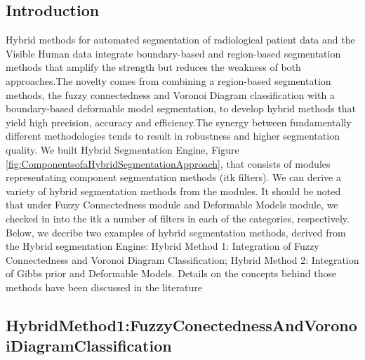 %
%
% 
%
%
%

\subsection{Introduction}
\label{sec:HybridSegmentationIntroduction}


Hybrid methods for automated segmentation of radiological patient data and the 
Visible Human data integrate boundary-based and region-based segmentation methods 
that amplify the strength but reduces the weakness of both approaches.The novelty 
comes from combining a region-based segmentation methods, the fuzzy connectedness 
and Voronoi Diagram classification with a boundary-based deformable model 
segmentation, to develop hybrid methods that yield high precision, accuracy and 
efficiency.The synergy between fundamentally different methodologies tends to 
result in robustness and higher segmentation quality. We built Hybrid Segmentation 
Engine,  Figure \ref{fig:ComponentsofaHybridSegmentationApproach}, that consists of modules 
representating component segmentation methods (itk filters). We can derive a variety 
of hybrid segmentation methods from the modules. It should be noted that under Fuzzy 
Connectedness module and Deformable Models module, we checked in into the itk a number 
of filters in each of the categories, respectively. Below, we decribe two examples of
hybrid segmentation methods, derived from the Hybrid segmentation Engine: Hybrid 
Method 1: Integration of Fuzzy Connectedness and Voronoi Diagram Classification;
Hybrid Method 2: Integration of Gibbs prior and Deformable Models.
Details on the concepts behind those methods have been discussed in the
literature
\cite{Angelini2002,Udupa2002,Jin2002,Imielinska2001,Imielinska2000a,Imielinska2000b}



\subsection{HybridMethod1:FuzzyConectednessAndVoronoiDiagramClassification}
\label{sec:HybridMethod1}

